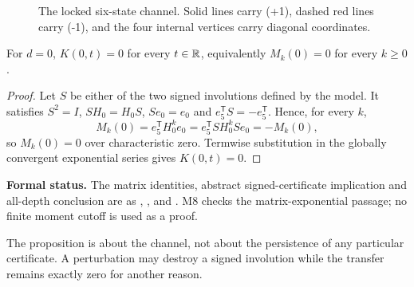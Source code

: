 \begin{figure}[ht]
\centering
\caption{The locked six-state channel.  Solid lines carry (+1), dashed red
lines carry (-1), and the four internal vertices carry diagonal coordinates.}
\label{fig:model}
\end{figure}

\begin{proposition}\label{prop:baseline-dark}
For \(d=0\), \(K(0,t)=0\) for every \(t\in\mathbb R\), equivalently
\(M_k(0)=0\) for every \(k\ge0\).
\end{proposition}
\begin{proof}
Let $S$ be either of the two signed involutions defined by the model.  It
satisfies $S^2=I$, $SH_0=H_0S$, $Se_0=e_0$ and
$e_5^{\mathsf T}S=-e_5^{\mathsf T}$.  Hence, for every $k$,
\[
M_k(0)=e_5^{\mathsf T}H_0^ke_0
=e_5^{\mathsf T}S H_0^k S e_0=-M_k(0),
\]
so $M_k(0)=0$ over characteristic zero.  Termwise substitution in the
globally convergent exponential series gives $K(0,t)=0$.
\end{proof}

\noindent\textbf{Formal status.}
The matrix identities, abstract signed-certificate implication and all-depth
conclusion are  as
, ,
 and
.  M8 checks the matrix-exponential passage;
no finite moment cutoff is used as a proof.

\begin{remark}
The proposition is about the channel, not about the persistence of any
particular certificate.  A perturbation may destroy a signed involution while
the transfer remains exactly zero for another reason.
\end{remark}
